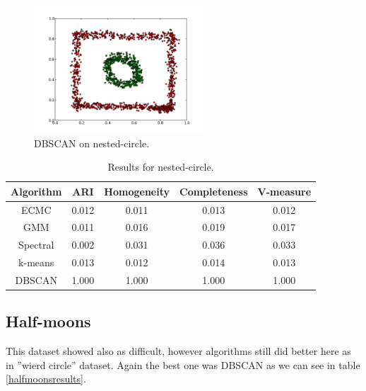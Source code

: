 \documentclass[conference]{IEEEtran}
\begin{document}
\begin{figure}[th]
\centering
\includegraphics[width=15pc]{dbscan_circle-weird.pdf}
\caption{DBSCAN on nested-circle.}
\label{DBSCAN_circleweird}
\end{figure}

\begin{table}[htbp]
\caption{Results for nested-circle.}
\label{circleweirdresults}
\begin{center}
\setlength{\tabcolsep}{3pt}
\begin{tabular}{ |c|c|c|c|c| }
\hline
	Algorithm & ARI & Homogeneity & Completeness & V-measure\\ \hline
	
	ECMC & 0.012 & 0.011 & 0.013 & 0.012 \\ \hline
	GMM & 0.011 & 0.016 & 0.019 & 0.017 \\ \hline
	Spectral & 0.002 & 0.031 & 0.036 & 0.033 \\ \hline
	k-means & 0.013 & 0.012 & 0.014 & 0.013 \\ \hline
	DBSCAN & 1.000 & 1.000 & 1.000 & 1.000 \\ \hline
\end{tabular}
\end{center}
\end{table}


\subsection{Half-moons}

This dataset showed also as difficult, however algorithms still did better here as in ''wierd circle'' dataset. Again
the best one was DBSCAN as we can see in table \ref{halfmoonsresults}. 
\end{document}
